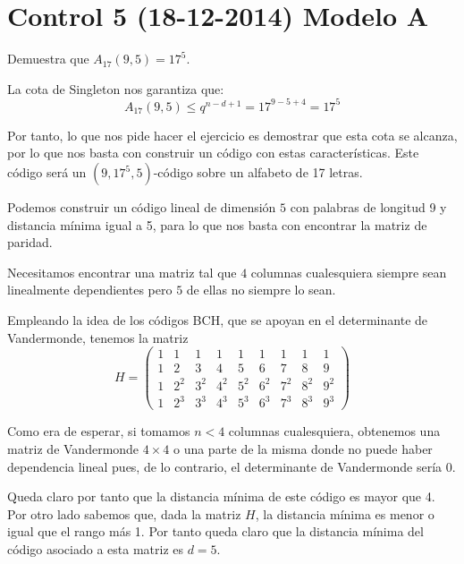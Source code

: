 \section{Control 5 (18-12-2014) Modelo A}
\begin{problem}[1]
Demuestra que $A_{17}(9,5)=17^5$.
\solution

La cota de Singleton nos garantiza que:
\[A_{17}(9,5) \leq q^{n-d+1} = 17^{9-5+4} = 17^5\]

Por tanto, lo que nos pide hacer el ejercicio es demostrar que esta cota se alcanza, por lo que nos basta con construir un código con estas características. Este código será un $(9,17^5,5)$-código sobre un alfabeto de 17 letras.

Podemos construir un código lineal de dimensión $5$ con palabras de longitud 9 y distancia mínima igual a 5, para lo que nos basta con encontrar la matriz de paridad.

Necesitamos encontrar una matriz tal que $4$ columnas cualesquiera siempre sean linealmente dependientes pero $5$ de ellas no siempre lo sean.

Empleando la idea de los códigos BCH, que se apoyan en el determinante de Vandermonde, tenemos la matriz
\[H = \left(\begin{array}{ccccccccc}
1 & 1 & 1 & 1 & 1 & 1 & 1 & 1 & 1 \\
1 & 2 & 3 & 4 & 5 & 6 & 7 & 8 & 9 \\
1 & 2^2 & 3^2 & 4^2 & 5^2 & 6^2 & 7^2 & 8^2 & 9^2 \\
1 & 2^3 & 3^3 & 4^3 & 5^3 & 6^3 & 7^3 & 8^3 & 9^3
\end{array} \right)\]

Como era de esperar, si tomamos $n<4$ columnas cualesquiera, obtenemos una matriz de Vandermonde $4\times 4$ o una parte de la misma donde no puede haber dependencia lineal pues, de lo contrario, el determinante de Vandermonde sería 0.

Queda claro por tanto que la distancia mínima de este código es mayor que 4. Por otro lado sabemos que, dada la matriz $H$, la distancia mínima es menor o igual que el rango más 1. Por tanto queda claro que la distancia mínima del código asociado a esta matriz es $d=5$.


\end{problem}


